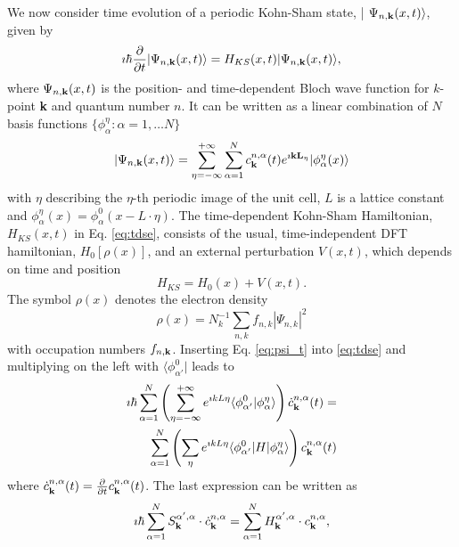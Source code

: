 \documentclass[journal=jctcce,manuscript=article,etalmode=truncate,maxauthors=10,layout=twocolumn,9pt]{achemso}   %
\begin{document}
We now consider time evolution of a periodic Kohn-Sham state, | $\Psi_{n,{\bf k}}(x,t) \rangle$, given by 
\begin{equation}
\imath \hbar \frac{\partial{}} {\partial t} |\Psi_{n,{\bf k}}(x,t) \rangle   
=    H_{KS}(x,t) | \Psi_{n,{\bf k}}(x,t)  \rangle,
\label{eq:tdse}
\end{equation}
where $\Psi_{n,{\bf k}}(x,t)$ is the position-  and time-dependent Bloch wave function for $k$-point {\bf k} and quantum number
 $n$. It can be written as a linear combination of $N$ basis functions $\{ \phi_\alpha^\eta: \alpha=1,\ldots N\}$ 
\begin{equation}
| \Psi_{n,{\bf k}}(x,t) \rangle = \sum_{\eta=-\infty}^{+\infty}  \sum_{\alpha=1}^N   
    c_{\bf k}^{n,\alpha}(t) e^{\imath {\bf k L_\eta} } | \phi_\alpha^\eta (x) \rangle
\label{eq:psi_t}
\end{equation}
with $\eta$ describing  the $\eta$-th periodic image of the unit cell,  $L$  is a lattice constant and $\phi_\alpha^\eta(x)  = \phi_\alpha^0(x - L\cdot \eta)$.
The time-dependent Kohn-Sham Hamiltonian, $H_{KS}(x,t)$ in Eq. \ref{eq:tdse}, consists of the usual, time-independent DFT hamiltonian, $H_0[\rho(x)]$, and an external perturbation  $V(x,t)$,  which depends  on time and position 
\begin{equation}
   H_{KS}= H_0(x) + V(x,t).  
\end{equation}
The  symbol $\rho(x)$ denotes the electron density
\begin{equation}
\rho(x)= N_k^{-1}\sum_{n,k} f_{n,k} |\Psi_{n,k}|^2
\end{equation}
with occupation numbers  $f_{n,\bf{k}}$.
Inserting Eq. \ref{eq:psi_t} into \ref{eq:tdse}   and multiplying on the left  with $\langle \phi_{\alpha'}^0 | $ leads to
\begin{eqnarray}
    \imath \hbar\sum_{\alpha=1}^N \left( \sum_{\eta=-\infty}^{+\infty} e^{\imath kL\eta}\langle \phi_{\alpha'}^0 |  \phi_\alpha^\eta \rangle\right) \dot c_{\bf{k}}^{n,\alpha} (t)  = \nonumber \\ 
    \sum_{\alpha=1}^N 
    \left( \sum_\eta e^{\imath kL\eta}  \langle \phi^0_{\alpha'} | H| \phi^\eta_\alpha \rangle \right)  c_{\bf{k}}^{n,\alpha} (t)
\end{eqnarray}
where $\dot c_{\bf{k}}^{n,\alpha} (t)  = \frac{\partial}{\partial t}  c_{\bf{k}}^{n,\alpha}(t) $. The last expression can be written  as
\begin{eqnarray}
     \imath \hbar  \sum_{\alpha=1}^N  S^{\alpha',\alpha}_{\bf{k}}
\cdot \dot c_{\bf{k}}^{n,\alpha} =  
\sum_{\alpha=1}^N  H^{\alpha',\alpha}_{\bf{k}}
\cdot c_{\bf{k}}^{n,\alpha},
\end{eqnarray}
\end{document}
